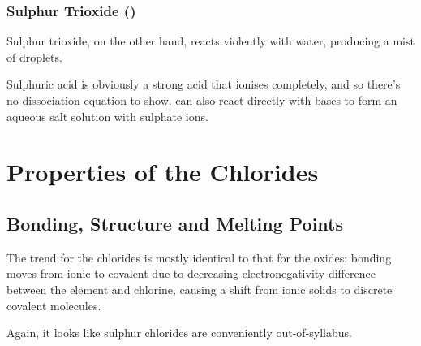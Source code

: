			\subsubsection{Sulphur Trioxide ()}

				Sulphur trioxide, on the other hand, reacts violently with water, producing a mist of  droplets.


				Sulphuric acid is obviously a strong acid that ionises completely, and so there's no dissociation equation to show.
				 can also react directly with bases to form an aqueous salt solution with sulphate ions.






	\pagebreak
	\section{Properties of the Chlorides}

		\subsection{Bonding, Structure and Melting Points}

			The trend for the chlorides is mostly identical to that for the oxides; bonding moves from ionic to covalent due to decreasing
			electronegativity difference between the element and chlorine, causing a shift from ionic solids to discrete covalent molecules.

			Again, it looks like sulphur chlorides are conveniently out-of-syllabus.

